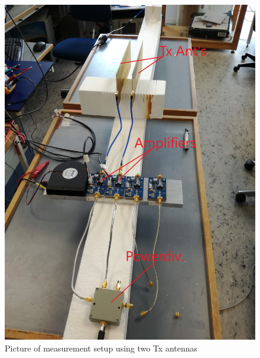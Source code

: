 \begin{figure}[H]
\centering 
\includegraphics[scale = 0.06]{figures/measurement/cree/meas3/meas3.jpg}
\caption{Picture of measurement setup using two Tx antennas}
\label{fig:meas_amp3-2}
\end{figure}

